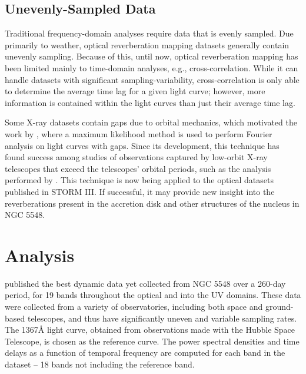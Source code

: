 \documentclass[11pt,letterpaper]{article}
\begin{document}
\begin{figure}
\begin{minipage}{.475\textwidth}
            \label{fig:th_freq}
        \end{minipage}
    \end{figure}


	\subsection{Unevenly-Sampled Data}

    Traditional frequency-domain analyses require data that is evenly sampled. Due primarily to weather, optical reverberation mapping datasets generally contain unevenly sampling. Because of this, until now, optical reverberation mapping has been limited mainly to time-domain analyses, e.g., cross-correlation. While it can handle datasets with significant sampling-variability, cross-correlation is only able to determine the average time lag for a given light curve; however, more information is contained within the light curves than just their average time lag.

    Some X-ray datasets contain gaps due to orbital mechanics, which motivated the work by \cite{2013ApJ...777...24Z}, where a maximum likelihood method is used to perform Fourier analysis on light curves with gaps. Since its development, this technique has found success among studies of observations captured by low-orbit X-ray telescopes that exceed the telescopes' orbital periods, such as the analysis performed by \cite{2016arXiv160606736K}. This technique is now being applied to the optical datasets published in STORM III. If successful, it may provide new insight into the reverberations present in the accretion disk and other structures of the nucleus in NGC 5548.

\section{Analysis}

\cite{2016ApJ...821...56F} published the best dynamic data yet collected from NGC 5548 over a 260-day period, for 19 bands throughout the optical and into the UV domains. These data were collected from a variety of observatories, including both space and ground-based telescopes, and thus have significantly uneven and variable sampling rates. The 1367\AA$ $ light curve, obtained from observations made with the Hubble Space Telescope, is chosen as the reference curve. The power spectral densities and time delays as a function of temporal frequency are computed for each band in the dataset -- 18 bands not including the reference band.
\end{document}
